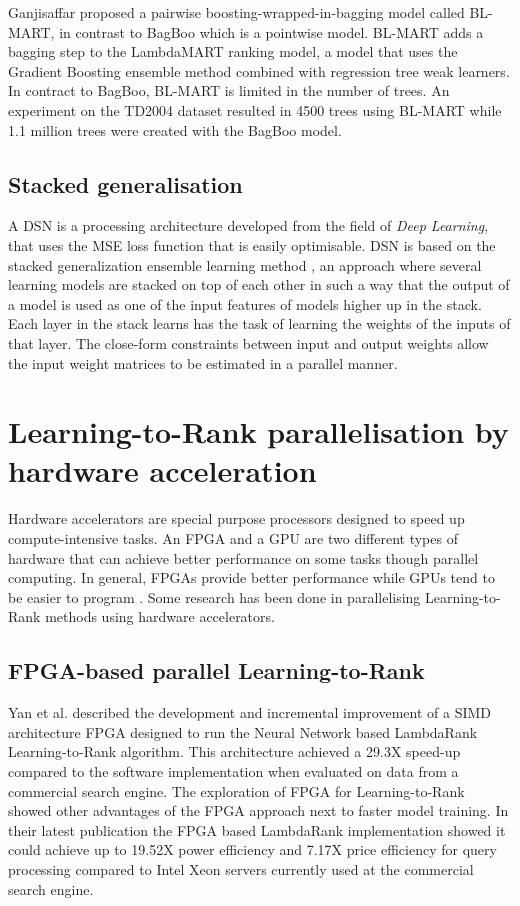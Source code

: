 Ganjisaffar \cite{Ganjisaffar2011b} proposed a pairwise boosting-wrapped-in-bagging model called BL-MART, in contrast to BagBoo which is a pointwise model. BL-MART adds a bagging step to the LambdaMART \cite{Wu2008} ranking model, a model that uses the Gradient Boosting \cite{Friedman2002} ensemble method combined with regression tree weak learners. In contract to BagBoo, BL-MART is limited in the number of trees. An experiment on the TD2004 dataset resulted in 4500 trees using BL-MART while 1.1 million trees were created with the BagBoo model.

\subsection{Stacked generalisation}
A \ac{DSN} is a processing architecture developed from the field of \emph{Deep Learning}, that uses the \ac{MSE} loss function that is easily optimisable. \ac{DSN} is based on the stacked generalization ensemble learning method \cite{Wolpert1992}, an approach where several learning models are stacked on top of each other in such a way that the output of a model is used as one of the input features of models higher up in the stack. Each layer in the stack learns has the task of learning the weights of the inputs of that layer. The close-form constraints between input and output weights allow the input weight matrices to be estimated in a parallel manner.\\

\section{Learning-to-Rank parallelisation by hardware acceleration}
Hardware accelerators are special purpose processors designed to speed up compute-intensive tasks. An \ac{FPGA} and a \ac{GPU} are two different types of hardware that can achieve better performance on some tasks though parallel computing. In general, \ac{FPGA}s provide better performance while \ac{GPU}s tend to be easier to program \cite{Che2008}. Some research has been done in parallelising Learning-to-Rank methods using hardware accelerators.

\subsection{FPGA-based parallel Learning-to-Rank}
Yan et al. \cite{Yan2009,Yan2010,Yan2011,Yan2012} described the development and incremental improvement of a \ac{SIMD} architecture \ac{FPGA} designed to run the Neural Network based LambdaRank Learning-to-Rank algorithm. This architecture achieved a 29.3X speed-up compared to the software implementation when evaluated on data from a commercial search engine. The exploration of \ac{FPGA} for Learning-to-Rank showed other advantages of the \ac{FPGA} approach next to faster model training. In their latest publication \cite{Yan2012} the \ac{FPGA} based LambdaRank implementation showed it could achieve up to 19.52X power efficiency and 7.17X price efficiency for query processing compared to Intel Xeon servers currently used at the commercial search engine.

